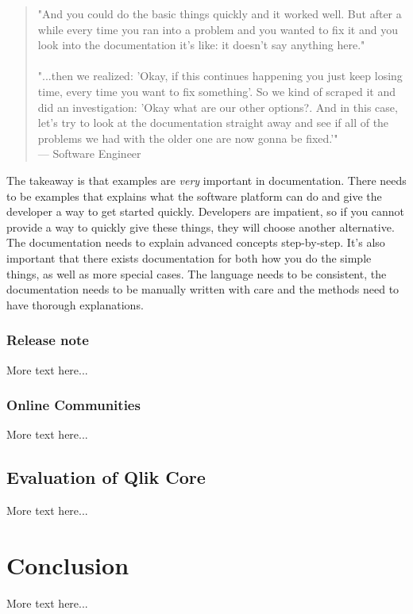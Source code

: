 \documentclass{article}
\begin{document}
\begin{quote}
"And you could do the basic things quickly and it worked well. But after a while every time you ran into a problem and you wanted to fix it and you look into the documentation it's like: it doesn't say anything here." \\ \\
"...then we realized: 'Okay, if this continues happening you just keep losing time, every time you want to fix something'. So we kind of scraped it and did an investigation: 'Okay what are our other options?. And in this case, let's try to look at the documentation straight away and see if all of the problems we had with the older one are now gonna be fixed.'" \\
--- Software Engineer
\end{quote}
The takeaway is that examples are \textit{very} important in documentation. There needs to be examples that explains what the software platform can do and give the developer a way to get started quickly. Developers are impatient, so if you cannot provide a way to quickly give these things, they will choose another alternative. The documentation needs to explain advanced concepts step-by-step. It's also important that there exists documentation for both how you do the simple things, as well as more special cases. The language needs to be consistent, the documentation needs to be manually written with care and the methods need to have thorough explanations.
\subsubsection{Release note}

More text here...

\subsubsection{Online Communities}

More text here...

\subsection{Evaluation of Qlik Core}

More text here...
\section{Conclusion}
More text here...
\newpage


\end{document}
